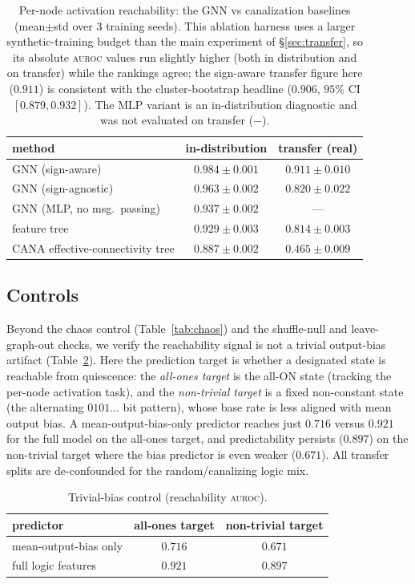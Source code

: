 \documentclass[journal]{IEEEtran}
\newcommand{\auroc}{\textsc{auroc}}
\begin{document}
\begin{table}[t]
\caption{Per-node activation reachability: the GNN vs canalization baselines
(mean$\pm$std over $3$ training seeds). This ablation harness uses a larger
synthetic-training budget than the main experiment of \S\ref{sec:transfer}, so its
absolute \auroc{} values run slightly higher (both in distribution and on transfer)
while the rankings agree; the sign-aware transfer figure here ($0.911$) is consistent
with the cluster-bootstrap headline ($0.906$, $95\%$ CI $[0.879,0.932]$). The MLP
variant is an in-distribution diagnostic and was not evaluated on transfer ($-$).}
\label{tab:ablation}
\centering
\begin{tabular}{lcc}
\toprule
method & in-distribution & transfer (real)\\
\midrule
GNN (sign-aware) & $\mathbf{0.984\pm0.001}$ & $\mathbf{0.911\pm0.010}$\\
GNN (sign-agnostic) & $0.963\pm0.002$ & $0.820\pm0.022$\\
GNN (MLP, no msg.\ passing) & $0.937\pm0.002$ & ---\\
feature tree & $0.929\pm0.003$ & $0.814\pm0.003$\\
CANA effective-connectivity tree & $0.887\pm0.002$ & $0.465\pm0.009$\\
\bottomrule
\end{tabular}
\end{table}


\subsection{Controls}
Beyond the chaos control (Table~\ref{tab:chaos}) and the shuffle-null and leave-graph-out
checks, we verify the reachability signal is not a trivial output-bias artifact
(Table~\ref{tab:trivial}). Here the prediction target is whether a designated state is
reachable from quiescence: the \emph{all-ones target} is the all-ON state (tracking the
per-node activation task), and the \emph{non-trivial target} is a fixed non-constant
state (the alternating $0101\ldots$ bit pattern), whose base rate is less aligned with
mean output bias. A mean-output-bias-only predictor reaches just $0.716$ versus $0.921$
for the full model on the all-ones target, and predictability persists ($0.897$) on the
non-trivial target where the bias predictor is even weaker ($0.671$). All transfer splits
are de-confounded for the random/canalizing logic mix.

\begin{table}[t]
\caption{Trivial-bias control (reachability \auroc{}).}
\label{tab:trivial}
\centering
\begin{tabular}{lcc}
\toprule
predictor & all-ones target & non-trivial target\\
\midrule
mean-output-bias only & $0.716$ & $0.671$\\
full logic features & $0.921$ & $0.897$\\
\bottomrule
\end{tabular}
\end{table}
\end{document}
